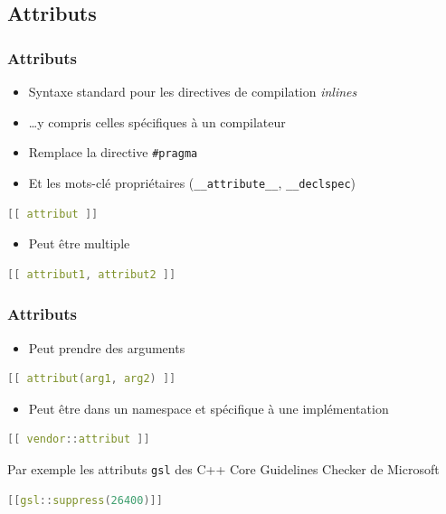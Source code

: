 \documentclass[C++.tex]{subfiles}
\begin{document}
\subsection*{Attributs}
\begin{frame}[fragile]
	\frametitle{Attributs}
	\begin{itemize}
		\item Syntaxe standard pour les directives de compilation \textit{inlines}
		\item \ldots y compris celles spécifiques à un compilateur
		\item Remplace la directive \lstinline|#pragma|
		\item Et les mots-clé propriétaires (\lstinline|__attribute__|, \lstinline|__declspec|)
	\end{itemize}

	\begin{lstlisting}[language=C++]
[[ attribut ]]\end{lstlisting}

	\begin{itemize}
		\item Peut être multiple
	\end{itemize}

	\begin{lstlisting}[language=C++]
[[ attribut1, attribut2 ]]\end{lstlisting}
\end{frame}

\begin{frame}[fragile]
	\frametitle{Attributs}
	\begin{itemize}
		\item Peut prendre des arguments
	\end{itemize}

	\begin{lstlisting}[language=C++]
[[ attribut(arg1, arg2) ]]\end{lstlisting}

	\begin{itemize}
		\item Peut être dans un namespace et spécifique à une implémentation
	\end{itemize}

	\begin{lstlisting}[language=C++]
[[ vendor::attribut ]]\end{lstlisting}

	\begin{block}{Par exemple}
		les attributs \lstinline|gsl| des \og C++ Core Guidelines Checker\fg{} de Microsoft
		
	\begin{lstlisting}[language=C++]
[[gsl::suppress(26400)]]\end{lstlisting}
	\end{block}
\end{frame}
\end{document}
